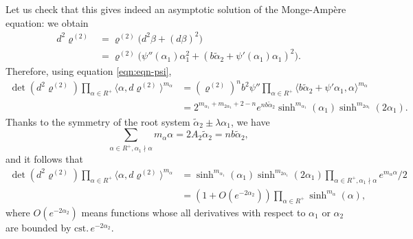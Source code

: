 \documentclass[JEP,XML,SOM,Unicode, NoEqCountersInSection, NoFloatCountersInSection]{cedram}
\theoremstyle{plain}
\theoremstyle{definition}
\newcommand{\ta}{\tilde \alpha}
\newcommand{\rRoots}{R}
\newcommand{\rhodeux}{\varrho^{(2)}}
\begin{document}
Let us check that this gives indeed an asymptotic solution of the Monge-Ampère equation: we obtain
\begin{align*}
d^2\rhodeux & = \rhodeux \big( d^2\beta+(d\beta)^2 \big) \\
& = \rhodeux \big( \psi''(\alpha_1) \alpha_1^2 + (b\ta_2+\psi'(\alpha_1)\alpha_1)^2 \big).
\end{align*}
Therefore, using equation \eqref{eqn:eqn-psi},
\begin{align*}
\det(d^2\rhodeux) \prod_{\alpha\in \rRoots^+}\langle\alpha,d\rhodeux\rangle^{m_\alpha} &
= (\rhodeux)^n b^2\psi'' \prod_{\alpha\in \rRoots^+}\langle b\ta_2+\psi'\alpha_1,\alpha\rangle^{m_{\alpha}} \\
& = 2^{m_{\alpha_1}+m_{2\alpha_1}+2-n}e^{nb\ta_2} \sinh^{m_{\alpha_1}}(\alpha_1) \sinh^{m_{2\alpha_1}}(2\alpha_1).
\end{align*}
Thanks to the symmetry of the root system $\ta_2\pm \lambda\alpha_1$, we have
\[ \sum_{\alpha\in \rRoots^+,\alpha_1\nmid\alpha} m_\alpha \alpha = 2 A_2 \ta_2 = nb \ta_2, \]
and it follows that
\begin{align*}
\det(d^2\rhodeux) \prod_{\alpha\in \rRoots^+}\langle\alpha,d\rhodeux\rangle^{m_\alpha}
& = \sinh^{m_{\alpha_1}}(\alpha_1) \sinh^{m_{2\alpha_1}}(2\alpha_1) \prod_{\alpha\in \rRoots^+,\alpha_1\nmid\alpha}e^{m_\alpha \alpha}/2 \\
& = (1+O(e^{-2\alpha_2})) \prod_{\alpha\in \rRoots^+} \sinh^{m_\alpha}(\alpha),
\end{align*}
where $O(e^{-2\alpha_2})$ means functions whose all derivatives with respect to $\alpha_1$ or $\alpha_2$ are bounded by $\mathrm{cst.}\, e^{-2\alpha_2}$.
\end{document}
